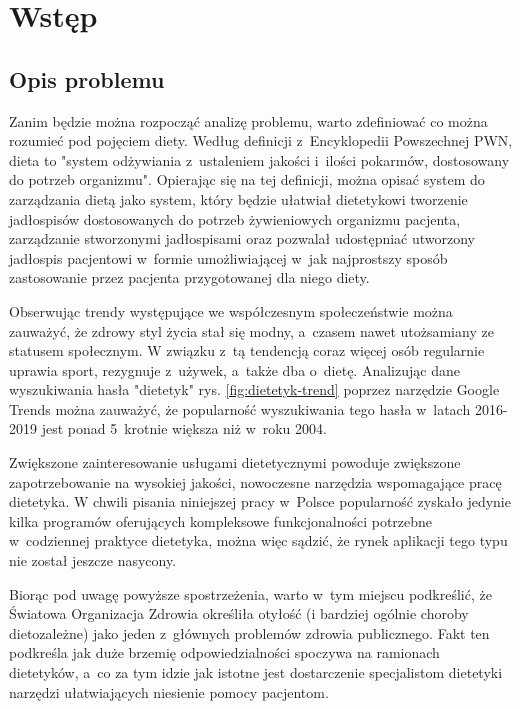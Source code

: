 \chapter*{Wstęp}\label{ch:admission}

\section*{Opis problemu}\label{sec:problem-description}

Zanim będzie można rozpocząć analizę problemu, warto zdefiniować co można rozumieć pod pojęciem diety.
Według definicji z~Encyklopedii Powszechnej PWN, dieta to "system odżywiania z~ustaleniem jakości i~ilości pokarmów,
dostosowany do potrzeb organizmu"\cite{book:encyklopedia-dieta}.
Opierając się na tej definicji, można opisać system do zarządzania dietą jako system,
który będzie ułatwiał dietetykowi tworzenie jadłospisów dostosowanych do potrzeb żywieniowych organizmu pacjenta, zarządzanie stworzonymi jadłospisami
oraz pozwalał udostępniać utworzony jadłospis pacjentowi w~formie umożliwiającej w~jak najprostszy sposób zastosowanie przez pacjenta przygotowanej dla niego diety.

\par
Obserwując trendy występujące we współczesnym społeczeństwie można zauważyć, że zdrowy styl życia stał się modny, a~czasem nawet utożsamiany ze statusem społecznym.
W związku z~tą tendencją coraz więcej osób regularnie uprawia sport, rezygnuje z~używek, a~także dba o~dietę.
Analizując dane wyszukiwania hasła "dietetyk" rys. \ref{fig:dietetyk-trend} poprzez narzędzie Google Trends\cite{url:google-trends} można zauważyć,
że popularność wyszukiwania tego hasła w~latach 2016-2019 jest ponad 5~krotnie większa niż w~roku 2004.

Zwiększone zainteresowanie usługami dietetycznymi powoduje zwiększone zapotrzebowanie na wysokiej jakości, nowoczesne narzędzia wspomagające pracę dietetyka.
W chwili pisania niniejszej pracy w~Polsce popularność zyskało jedynie kilka programów oferujących kompleksowe funkcjonalności potrzebne w~codziennej praktyce dietetyka,
można więc sądzić, że rynek aplikacji tego typu nie został jeszcze nasycony.

\par
Biorąc pod uwagę powyższe spostrzeżenia, warto w~tym miejscu podkreślić, że Światowa Organizacja Zdrowia określiła otyłość
(i bardziej ogólnie choroby dietozależne) jako jeden z~głównych problemów zdrowia publicznego\cite{article:dietetyk-na-rynku-uslug-medycznych}.
Fakt ten podkreśla jak duże brzemię odpowiedzialności spoczywa na ramionach dietetyków,
a~co za tym idzie jak istotne jest dostarczenie specjalistom dietetyki narzędzi ułatwiających niesienie pomocy pacjentom.

